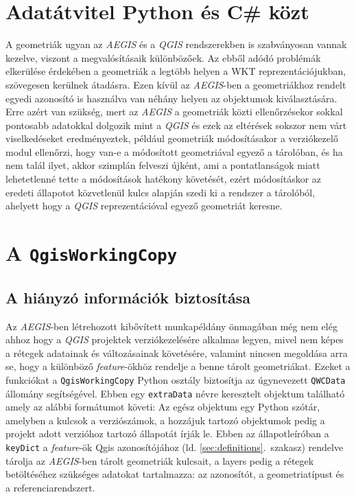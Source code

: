 \section{Adatátvitel Python és C\# közt}
A geometriák ugyan az \emph{AEGIS} és a \emph{QGIS} rendszerekben is szabványosan vannak kezelve, viszont a megvalósításaik különbözőek. Az ebből adódó problémák elkerülése érdekében a geometriák a legtöbb helyen a WKT reprezentációjukban, szövegesen kerülnek átadásra. Ezen kívül az \emph{AEGIS}-ben a geometriákhoz rendelt egyedi azonosító is használva van néhány helyen az objektumok kiválasztására. Erre azért van szükség, mert az \emph{AEGIS} a geometriák közti ellenőrzésekor sokkal pontosabb adatokkal dolgozik mint a \emph{QGIS} és ezek az eltérések sokszor nem várt viselkedéseket eredményeztek, például geometriák módosításakor a verziókezelő modul ellenőrzi, hogy van-e a módosított geometriával egyező a tárolóban, és ha nem talál ilyet, akkor szimplán felveszi újként, ami a pontatlanságok miatt lehetetlenné tette a módosítások hatékony követését, ezért módosításkor az eredeti állapotot közvetlenül kulcs alapján szedi ki a rendszer a tárolóból, ahelyett hogy a \emph{QGIS} reprezentációval egyező geometriát keresne.

\section{A \texttt{QgisWorkingCopy}}
\subsection{A  hiányzó információk biztosítása}
Az \emph{AEGIS}-ben létrehozott kibővített munkapéldány önmagában még nem elég ahhoz hogy a \emph{QGIS} projektek verziókezelésére alkalmas legyen, mivel nem képes a rétegek adatainak és változásainak követésére, valamint nincsen megoldása arra se, hogy a különböző \emph{feature}-ökhöz rendelje a benne tárolt geometriákat. Ezeket a funkciókat a \texttt{QgisWorkingCopy} Python osztály biztosítja az úgynevezett \texttt{QWCData} állomány segítségével. Ebben egy \texttt{extraData} névre keresztelt objektum található amely az alábbi formátumot követi:
Az egész objektum egy Python szótár, amelyben a kulcsok a verziószámok, a hozzájuk tartozó objektumok pedig a projekt adott verzióhoz tartozó állapotát írják le. Ebben az állapotleíróban a \texttt{keyDict} a \emph{feature}-ök Qgis azonosítójához (ld. \ref{sec:definitions}.~szakasz) rendelve tárolja az \emph{AEGIS}-ben tárolt geometriák kulcsait, a layers pedig a rétegek betöltéséhez szükséges adatokat tartalmazza: az azonosítót, a geometriatípust és a referenciarendszert.
